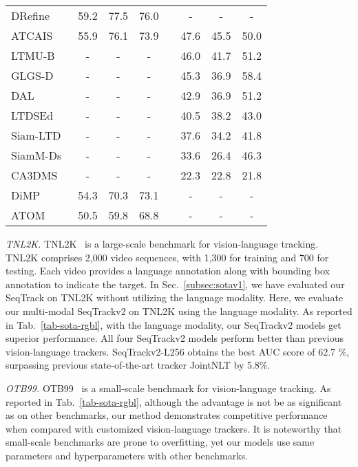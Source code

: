 \begin{table}[t]
{{\begin{tabular}{l|ccc c ccc}
    DRefine~\cite{vot2021} &59.2&77.5&76.0 & &-&-&-\\
    ATCAIS~\cite{vot2020} &55.9&76.1&73.9 & &47.6&45.5&50.0\\
    LTMU-B~\cite{LTMU} &-&-&- & &46.0&41.7&51.2\\
    GLGS-D~\cite{vot2020} &-&-&- & &45.3&36.9&58.4\\
    DAL~\cite{dal} &-&-&- & &42.9&36.9&51.2\\
    LTDSEd~\cite{VOT2019} &-&-&- & &40.5&38.2&43.0\\
    Siam-LTD~\cite{vot2020} &-&-&- & &37.6&34.2&41.8\\
    SiamM-Ds~\cite{VOT2019} &-&-&- & &33.6&26.4&46.3\\
    CA3DMS~\cite{ca3dms} &-&-&- & &22.3&22.8&21.8\\
    DiMP~\cite{DiMP} &54.3&70.3&73.1 & &-&-&-\\
    ATOM~\cite{ATOM} &50.5&59.8&68.8 & &-&-&-\\
    \bottomrule
    \end{tabular}
    }
  }
  \vspace{-3mm}
\end{table}

\textit{TNL2K.}
TNL2K~\cite{TNL2K} is a large-scale benchmark for vision-language tracking. TNL2K comprises 2,000 video sequences, with 1,300 for training and 700 for testing. Each video provides a language annotation along with bounding box annotation to indicate the target. In Sec.~\ref{subsec:sotav1}, we have evaluated our SeqTrack on TNL2K without utilizing the language modality. Here, we evaluate our multi-modal SeqTrackv2 on TNL2K using the language modality. As reported in Tab.~\ref{tab-sota-rgbl}, with the language modality, our SeqTrackv2 models get superior performance. All four SeqTrackv2 models perform better than previous vision-language trackers. SeqTrackv2-L256 obtains the best  AUC score of 62.7 \%, surpassing previous state-of-the-art tracker JointNLT by 5.8\%.

\textit{OTB99.}
OTB99~\cite{TNLS} is a small-scale benchmark for vision-language tracking.  As reported in Tab.~\ref{tab-sota-rgbl}, although the advantage is not be as significant as on other benchmarks, our method demonstrates competitive performance when compared with customized vision-language trackers. It is noteworthy that small-scale benchmarks are prone to overfitting, yet our models use same parameters and hyperparameters with other benchmarks.

